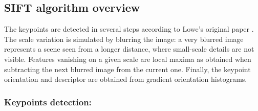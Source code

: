 \documentclass[preprint]{iucr}
\begin{document}
\subsection{SIFT algorithm overview}



The keypoints are detected in several steps according to Lowe's
original paper \cite{Lowe99}.
The scale variation is simulated by blurring the image:
a very blurred image represents a scene seen from a longer distance, where
small-scale details are not visible.
Features vanishing on a given scale are
local maxima as obtained when subtracting the next blurred image from the
current one.
Finally, the keypoint orientation and descriptor are obtained from gradient
orientation histograms.


\subsubsection{Keypoints detection:}
\end{document}
